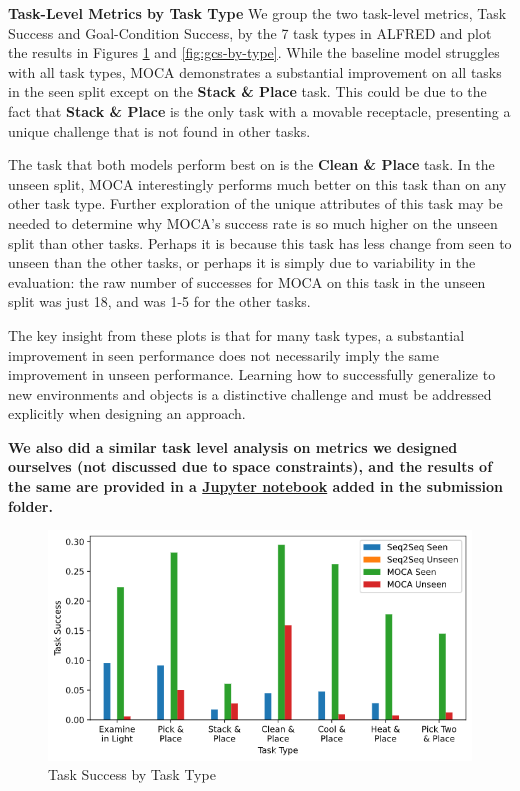 \documentclass[11pt,a4paper]{article}
\begin{document}
\textbf{Task-Level Metrics by Task Type}
We group the two task-level metrics, Task Success and Goal-Condition Success, by the 7 task types in ALFRED and plot the results in Figures \ref{fig:ts-by-type} and \ref{fig:gcs-by-type}. While the baseline model struggles with all task types, MOCA demonstrates a substantial improvement on all tasks in the seen split except on the \textbf{Stack \& Place} task. This could be due to the fact that \textbf{Stack \& Place} is the only task with a movable receptacle, presenting a unique challenge that is not found in other tasks. 

The task that both models perform best on is the \textbf{Clean \& Place} task. In the unseen split, MOCA interestingly performs much better on this task than on any other task type. Further exploration of the unique attributes of this task may be needed to determine why MOCA's success rate is so much higher on the unseen split than other tasks. Perhaps it is because this task has less change from seen to unseen than the other tasks, or perhaps it is simply due to variability in the evaluation: the raw number of successes for MOCA on this task in the unseen split was just 18, and was 1-5 for the other tasks.

The key insight from these plots is that for many task types, a substantial improvement in seen performance does not necessarily imply the same improvement in unseen performance. Learning how to successfully generalize to new environments and objects is a distinctive challenge and must be addressed explicitly when designing an approach.

\textbf{We also did a similar task level analysis on metrics we designed ourselves (not discussed due to space constraints), and the results of the same are provided in a \href{https://github.com/ankit61/group-tars-alfred/blob/main/Reports/4-Analysis-of-Baselines/results_analysis.ipynb}{Jupyter notebook} added in the submission folder.}

\begin{figure}[H]
\centering
\includegraphics[scale=0.33]{figures/ts_by_type.png}
\caption{Task Success by Task Type}
\label{fig:ts-by-type}
\end{figure}
\end{document}
